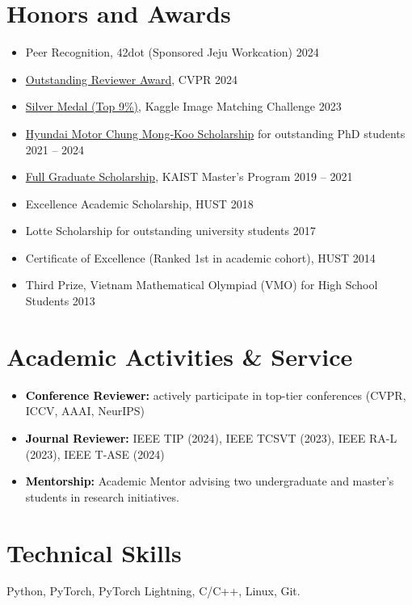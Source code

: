 \documentclass[11pt,a4paper]{article}
\newcommand{\kw}[1]{\textbf{\textcolor{black}{#1}}}
\begin{document}
\section{Honors and Awards}

\begin{itemize}
    \item Peer Recognition, 42dot (Sponsored Jeju Workcation) \hfill 2024
    \item \href{https://www.computer.org/csdl/proceedings-article/cvpr/2024/530000z352/20hQ1juBJfi}{Outstanding Reviewer Award}, CVPR \hfill 2024
    \item \href{https://www.kaggle.com/competitions/image-matching-challenge-2023/leaderboard}{Silver Medal (Top 9\%)}, Kaggle Image Matching Challenge \hfill 2023
    \item \href{https://www.hyundai-cmkfoundation.org/en/com/scholarship}{Hyundai Motor Chung Mong-Koo Scholarship} for outstanding PhD students \hfill 2021 -- 2024
    \item \href{https://admission.kaist.ac.kr/intl-graduate/FinancialSupport/Scholarship/KAISTScholarship/}{Full Graduate Scholarship}, KAIST Master's Program \hfill 2019 -- 2021
    \item Excellence Academic Scholarship, HUST \hfill 2018
    \item Lotte Scholarship for outstanding university students \hfill 2017
    \item Certificate of Excellence (Ranked 1st in academic cohort), HUST \hfill 2014
    \item Third Prize, Vietnam Mathematical Olympiad (VMO) for High School Students \hfill 2013
\end{itemize}

\section{Academic Activities \& Service}

\begin{itemize}
    \item \kw{Conference Reviewer:} actively participate in top-tier conferences (CVPR, ICCV, AAAI, NeurIPS)
    \item \kw{Journal Reviewer:} IEEE TIP (2024), IEEE TCSVT (2023), IEEE RA-L (2023), IEEE T-ASE (2024)
    \item \kw{Mentorship:} Academic Mentor advising two undergraduate and master's students in
          research initiatives.
\end{itemize}

\section{Technical Skills}

Python, PyTorch, PyTorch Lightning, C/C++, Linux, Git.
\end{document}
